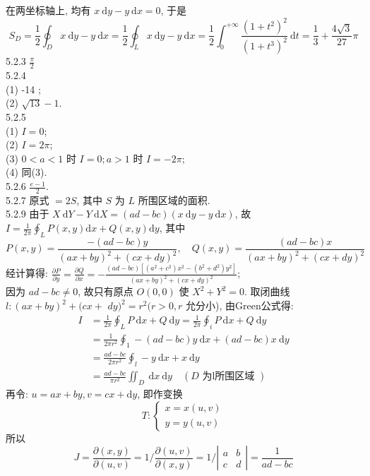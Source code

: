 \documentclass[a4paper,11pt,UTF8]{article}
\begin{document}
在两坐标轴上, 均有 $x \mathrm{~d} y-y \mathrm{~d} x=0$, 于是
$$
S_D=\frac{1}{2} \oint_D x \mathrm{~d} y-y \mathrm{~d} x=\frac{1}{2} \oint_L x \mathrm{~d} y-y \mathrm{~d} x=\frac{1}{2} \int_0^{+\infty} \frac{\left(1+t^2\right)^2}{\left(1+t^3\right)^2} \mathrm{~d} t=\frac{1}{3}+\frac{4 \sqrt{3}}{27} \pi
$$
5.2.3 $ \frac{\pi}{2}$\\
5.2.4\\
(1) -14 ;\\
(2) $\sqrt{13}-1$.\\
5.2.5\\
(1) $I=0$;\\
(2) $I=2 \pi$;\\
(3) $0<a<1$ 时 $I=0 ; a>1$ 时 $I=-2 \pi$;\\
(4) 同(3).\\
5.2.6 $\frac{e-1}{2}$.\\
5.2.7 原式 $=2 S$, 其中 $S$ 为 $L$ 所围区域的面积.\\
5.2.9 由于 $X \mathrm{~d} Y-Y \mathrm{~d} X=(a d-b c)(x \mathrm{~d} y-y \mathrm{~d} x)$, 故 $I=\frac{1}{2 \pi} \oint_L P(x, y) \mathrm{d} x+Q(x, y) \mathrm{d} y$, 其中
$$
P(x, y)=\frac{-(a d-b c) y}{(a x+b y)^2+(c x+d y)^2}, \quad Q(x, y)=\frac{(a d-b c) x}{(a x+b y)^2+(c x+d y)^2}
$$
经计算得: $\frac{\partial P}{\partial y}=\frac{\partial Q}{\partial x}=-\frac{(a d-b c)\left[\left(a^2+c^2\right) x^2-\left(b^2+d^2\right) y^2\right]}{(a x+b y)^2+(c x+d y)^2}$;\\
因为 $a d-b c \neq 0$, 故只有原点 $O(0,0)$ 使 $X^2+Y^2=0$. 取闭曲线 $l:(a x+b y)^2+(c x+$ $d y)^2=r^2(r>0, r$ 允分小), 由Green公式得:
$$
\begin{aligned}
	I & =\frac{1}{2 \pi} \oint_L P \mathrm{~d} x+Q \mathrm{~d} y=\frac{1}{2 \pi} \oint_i P \mathrm{~d} x+Q \mathrm{~d} y \\
	& =\frac{1}{2 \pi r^2} \oint_1-(a d-b c) y \mathrm{~d} x+(a d-b c) x \mathrm{~d} y \\
	& =\frac{a d-b c}{2 \pi r^2} \oint_l-y \mathrm{~d} x+x \mathrm{~d} y \\
	& =\frac{a d-b c}{\pi r^2} \iint_D \mathrm{~d} x \mathrm{~d} y \quad(D \text { 为l所围区域 })
\end{aligned}
$$
再令: $u=a x+b y, v=c x+\mathrm{d} y$, 即作变换
$$
T:\left\{\begin{array}{l}
	x=x(u, v) \\
	y=y(u, v)
\end{array}\right.
$$
所以
$$
J=\frac{\partial(x, y)}{\partial(u, v)}=1 / \frac{\partial(u, v)}{\partial(x, y)}=1 /\left|\begin{array}{ll}
	a & b \\
	c & d
\end{array}\right|=\frac{1}{a d-b c}
$$
\end{document}
